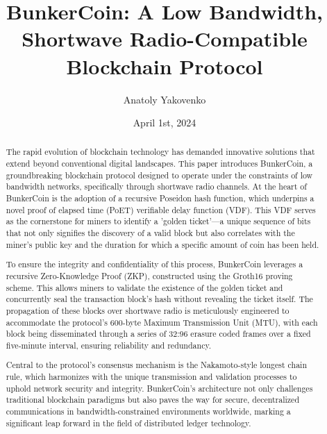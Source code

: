 \documentclass{article}
\title{BunkerCoin: A Low Bandwidth, Shortwave Radio-Compatible Blockchain Protocol}
\author{Anatoly Yakovenko}
\date{April 1st, 2024}
\begin{document}
\maketitle

\begin{abstract}
The rapid evolution of blockchain technology has demanded innovative solutions that extend beyond conventional digital landscapes. This paper introduces BunkerCoin, a groundbreaking blockchain protocol designed to operate under the constraints of low bandwidth networks, specifically through shortwave radio channels. At the heart of BunkerCoin is the adoption of a recursive Poseidon hash function, which underpins a novel proof of elapsed time (PoET) verifiable delay function (VDF). This VDF serves as the cornerstone for miners to identify a 'golden ticket'—a unique sequence of bits that not only signifies the discovery of a valid block but also correlates with the miner's public key and the duration for which a specific amount of coin has been held.

To ensure the integrity and confidentiality of this process, BunkerCoin leverages a recursive Zero-Knowledge Proof (ZKP), constructed using the Groth16 proving scheme. This allows miners to validate the existence of the golden ticket and concurrently seal the transaction block's hash without revealing the ticket itself. The propagation of these blocks over shortwave radio is meticulously engineered to accommodate the protocol's 600-byte Maximum Transmission Unit (MTU), with each block being disseminated through a series of 32:96 erasure coded frames over a fixed five-minute interval, ensuring reliability and redundancy.

Central to the protocol's consensus mechanism is the Nakamoto-style longest chain rule, which harmonizes with the unique transmission and validation processes to uphold network security and integrity. BunkerCoin's architecture not only challenges traditional blockchain paradigms but also paves the way for secure, decentralized communications in bandwidth-constrained environments worldwide, marking a significant leap forward in the field of distributed ledger technology.
\end{abstract}
\end{document}
